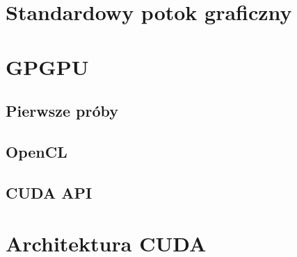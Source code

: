 	
	\section{Standardowy potok graficzny}
	\section{GPGPU}
		\subsection{Pierwsze próby}
		\subsection{OpenCL}
		\subsection{CUDA API}
	\section{Architektura CUDA}